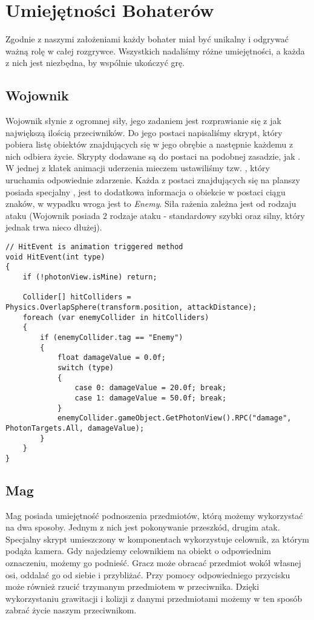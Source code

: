 \section{Umiejętności Bohaterów}
Zgodnie z naszymi założeniami każdy bohater miał być unikalny i odgrywać ważną rolę w całej rozgrywce. Wszystkich nadaliśmy różne umiejętności, a każda z nich jest niezbędna, by wspólnie ukończyć grę.

\subsection{Wojownik}

Wojownik słynie z ogromnej siły, jego zadaniem jest rozprawianie się z jak największą ilością przeciwników. Do jego postaci napisaliśmy skrypt, który pobiera listę obiektów znajdujących się w jego obrębie a następnie każdemu z nich odbiera życie. Skrypty dodawane są do postaci na podobnej zasadzie, jak . W jednej z klatek animacji uderzenia mieczem ustawiliśmy tzw. , który uruchamia odpowiednie zdarzenie. Każda z postaci znajdujących się na planszy posiada specjalny , jest to dodatkowa informacja o obiekcie w postaci ciągu znaków, w wypadku wroga jest to \textit{Enemy}. Siła rażenia zależna jest od rodzaju ataku (Wojownik posiada 2 rodzaje ataku - standardowy szybki oraz silny, który jednak trwa nieco dłużej).
\\
\begin{lstlisting}[caption={Algorytm zadawania obrażeń wrogom}]
// HitEvent is animation triggered method
void HitEvent(int type)
{
    if (!photonView.isMine) return;

    Collider[] hitColliders = Physics.OverlapSphere(transform.position, attackDistance);
    foreach (var enemyCollider in hitColliders)
    {
        if (enemyCollider.tag == "Enemy")
        {
            float damageValue = 0.0f;
            switch (type)
            {
                case 0: damageValue = 20.0f; break;
                case 1: damageValue = 50.0f; break;
            }
            enemyCollider.gameObject.GetPhotonView().RPC("damage", PhotonTargets.All, damageValue);
        }
    }
}
\end{lstlisting}


\subsection{Mag}

Mag posiada umiejętność podnoszenia przedmiotów, którą możemy wykorzystać na dwa sposoby. Jednym z nich jest pokonywanie przeszkód, drugim atak. Specjalny skrypt umieszczony w komponentach wykorzystuje celownik, za którym podąża kamera. Gdy najedziemy celownikiem na obiekt o odpowiednim oznaczeniu, możemy go podnieść. Gracz może obracać przedmiot wokół własnej osi, oddalać go od siebie i przybliżać. Przy pomocy odpowiedniego przycisku może również rzucić trzymanym przedmiotem w przeciwnika. Dzięki wykorzystaniu grawitacji i kolizji z danymi przedmiotami możemy w ten sposób zabrać życie naszym przeciwnikom.


